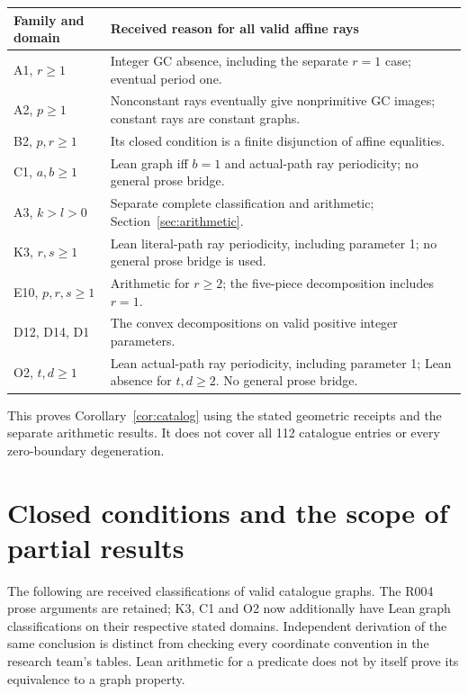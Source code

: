 \documentclass[11pt]{amsart}
\theoremstyle{definition}\newtheorem{definition}{Definition}
\begin{document}
\begin{center}\small
\begin{tabular}{p{}p{}}\toprule
Family and domain & Received reason for all valid affine rays\\\midrule
A1, $r\ge1$ & Integer GC absence, including the separate $r=1$ case; eventual period one.\\
A2, $p\ge1$ & Nonconstant rays eventually give nonprimitive GC images; constant rays are constant graphs.\\
B2, $p,r\ge1$ & Its closed condition is a finite disjunction of affine equalities.\\
C1, $a,b\ge1$ & Lean graph iff $b=1$ and actual-path ray periodicity; no general prose bridge.\\
A3, $k>l>0$ & Separate complete classification and arithmetic; Section~\ref{sec:arithmetic}.\\
K3, $r,s\ge1$ & Lean literal-path ray periodicity, including parameter 1; no general prose bridge is used.\\
E10, $p,r,s\ge1$ & Arithmetic for $r\ge2$; the five-piece decomposition includes $r=1$.\\
D12, D14, D1 & The convex decompositions on valid positive integer parameters.\\
O2, $t,d\ge1$ & Lean actual-path ray periodicity, including parameter 1; Lean absence for $t,d\ge2$. No general prose bridge.\\\bottomrule
\end{tabular}
\end{center}
This proves Corollary~\ref{cor:catalog} using the stated geometric
receipts and the separate arithmetic results. It does not cover all
112 catalogue entries or every zero-boundary degeneration.

\section{Closed conditions and the scope of partial results}\label{sec:conditions}
The following are received classifications of valid catalogue graphs.
The R004 prose arguments are retained; K3, C1 and O2 now additionally
have Lean graph classifications on their respective stated domains. Independent derivation of the same conclusion is distinct
from checking every coordinate convention in the research team's
tables. Lean arithmetic for a predicate does not by itself prove its
equivalence to a graph property.
\end{document}
